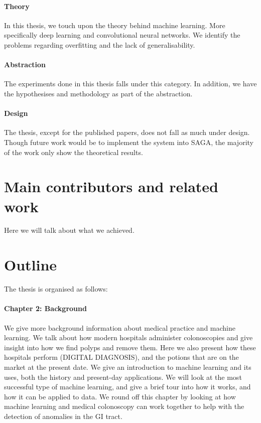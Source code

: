 \paragraph{Theory}
In this thesis, we touch upon the theory behind machine learning. More specifically deep learning and convolutional neural networks. We identify the problems regarding overfitting and the lack of generalisability.

\paragraph{Abstraction}
The experiments done in this thesis falls under this category. In addition, we have the hypothesises and methodology as part of the abstraction.

\paragraph{Design}
The thesis, except for the published papers, does not fall as much under design. Though future work would be to implement the system into SAGA, the majority of the work only show the theoretical results. 





\section{Main contributors and related work}



Here we will talk about what we achieved.














\section{Outline}
The thesis is organised as follows:

\paragraph{Chapter 2: Background}
We give more background information about medical practice and machine learning.
We talk about how modern hospitals administer colonoscopies and give insight into how we find polyps and remove them. Here we also present how these hospitals perform (DIGITAL DIAGNOSIS), and the potions that are on the market at the present date. 
We give an introduction to machine learning and its uses, both the history and present-day applications. We will look at the most successful type of machine learning, and give a brief tour into how it works, and how it can be applied to data.
We round off this chapter by looking at how machine learning and medical colonoscopy can work together to help with the detection of anomalies in the GI tract.

